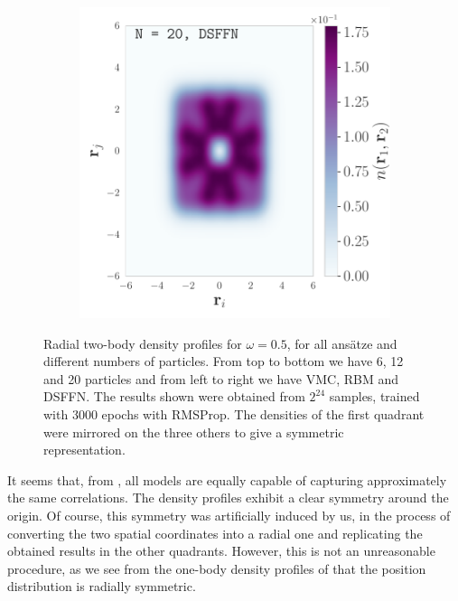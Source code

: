 \begin{figure}[H]
\begin{subfigure}[t]{0.32\textwidth}
        \hspace{-1cm}
    \end{subfigure}
    \begin{subfigure}[t]{0.32\textwidth}
        \centering
        \includegraphics[width=\textwidth]{Chapters/Results/dots/two_body_density_N[20]_nqs_DSFFN_0.5.pdf}
        \hspace{-1cm}
    \end{subfigure}
    \caption{Radial two-body density profiles for $\omega = 0.5$, for all ansätze and different numbers of particles. From top to bottom we have 6, 12 and 20 particles and from left to right we have VMC, RBM and DSFFN. The results shown were obtained from $2^{24}$ samples, trained with 3000 epochs with RMSProp. The densities of the first quadrant were mirrored on the three others to give a symmetric representation.}
    \label{fig:two_body}
\end{figure}

It seems that, from , all models are equally capable of capturing approximately the same correlations. The density profiles exhibit a clear symmetry around the origin. Of course, this symmetry was artificially induced by us, in the process of converting the two spatial coordinates into a radial one and replicating the obtained results in the other quadrants. However, this is not an unreasonable procedure, as we see from the one-body density profiles of  that the position distribution is radially symmetric.

